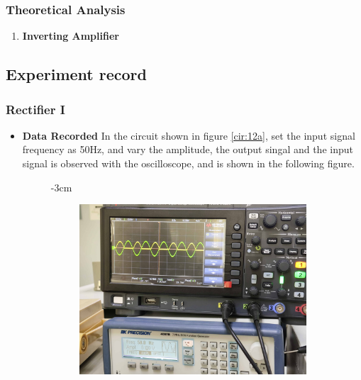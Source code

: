     \subsubsection{Theoretical Analysis}
        \begin{enumerate}[a]
            \item \textbf{Inverting Amplifier}
        \end{enumerate}

\subsection{Experiment record}
    \subsubsection{Rectifier I}
    \begin{itemize}
        \item \textbf{Data Recorded}\newline
        In the circuit shown in figure \ref{cir:12a}, set the input signal frequency as 50Hz, and vary the amplitude, the output singal and the input signal is observed with the oscilloscope, and is shown in the following figure.\par
        \begin{figure}[H]
        \addtolength{\leftskip} {-3cm}
        \addtolength{\rightskip}{-3cm}
        \centering
            \begin{subfigure}{0.3\textwidth}
                \centering
                \includegraphics[width=1\linewidth]{Experiment_12/Images/RetA 50-0-min.jpg}

\end{subfigure}
\end{figure}
\end{itemize}
